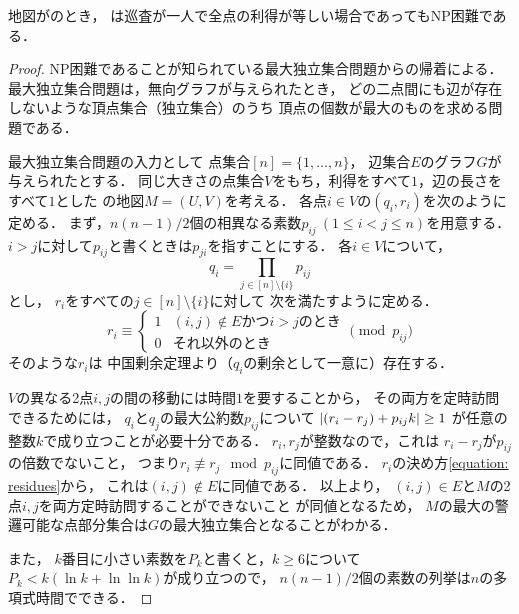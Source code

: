 \begin{theo}
  \label{theo:UnitExacIdletimeNPhard}
  地図が{\graphUnit}のとき，
  {\timeSpecifiedPatProb}は巡査が一人で全点の利得が等しい場合であってもNP困難である．
\end{theo}
\begin{proof}
  NP困難であることが知られている最大独立集合問題からの帰着による．
  最大独立集合問題は，無向グラフが与えられたとき，
  どの二点間にも辺が存在しないような頂点集合（独立集合）のうち
  頂点の個数が最大のものを求める問題である．

  \newcommand{\primenum}[2]{p_{{#1}{#2}}}
  最大独立集合問題の入力として
  点集合$[n] = \{1, \ldots, n\}$，
  辺集合$E$のグラフ$G$が与えられたとする．
  同じ大きさの点集合$V$をもち，利得をすべて$1$，辺の長さをすべて$1$とした
  {\graphUnit}の地図$M = (U, V)$を考える．
  各点$i \in V$の{\exactTime}$(q_i, r_i)$を次のように定める．
  まず，$n(n - 1)/2$個の相異なる素数$\primenum{i}{j}\ (1 \leq i < j \leq n)$を用意する．
  $i > j$に対して$\primenum{i}{j}$と書くときは$\primenum{j}{i}$を指すことにする．
  各$i \in V$について，
  \begin{equation}
    q_i = \prod_{j \in [n] \setminus \{i\}} \primenum{i}{j}
  \end{equation}
  とし，
  $r _i$をすべての$j \in [n] \setminus \{i\}$に対して
  次を満たすように定める．
  \begin{equation}
    \label{equation: residues}
    r _i
    \equiv
    \begin{cases}
      1 & \text{$(i, j) \notin E$かつ$i > j$のとき} \\
      0 & \text{それ以外のとき}
    \end{cases}
    \pmod{\primenum{i}{j}}
  \end{equation}
  そのような$r _i$は
  中国剰余定理より（$q _i$の剰余として一意に）存在する．

  $V$の異なる2点$i, j$の間の移動には時間$1$を要することから，
  その両方を定時訪問できるためには，
  $q_i$と$q_j$の最大公約数$\primenum{i}{j}$について
  $\abs{(r_i - r_j) + \primenum{i}{j} k} \geq 1$%
  が任意の整数$k$で成り立つことが必要十分である．
  $r_i, r_j$が整数なので，これは
  $r_i - r_j$が$\primenum{i}{j}$の倍数でないこと，
  つまり$r_i \not\equiv r_j \mod \primenum{i}{j}$に同値である．
  $r_i$の決め方\eqref{equation: residues}から，
  これは$(i, j) \notin E$に同値である．
  以上より，
  $(i, j) \in E$と$M$の2点$i, j$を両方定時訪問することができないこと
  が同値となるため，
  $M$の最大の警邏可能な点部分集合は$G$の最大独立集合となることがわかる．

  また，
  $k$番目に小さい素数を$P_k$と書くと，$k \geq 6$について
  $P_k < k( \ln k + \ln\ln k )$が成り立つ\cite{dusart1999k}ので，
  $n(n - 1)/2$個の素数の列挙は$n$の多項式時間でできる．
\end{proof}

